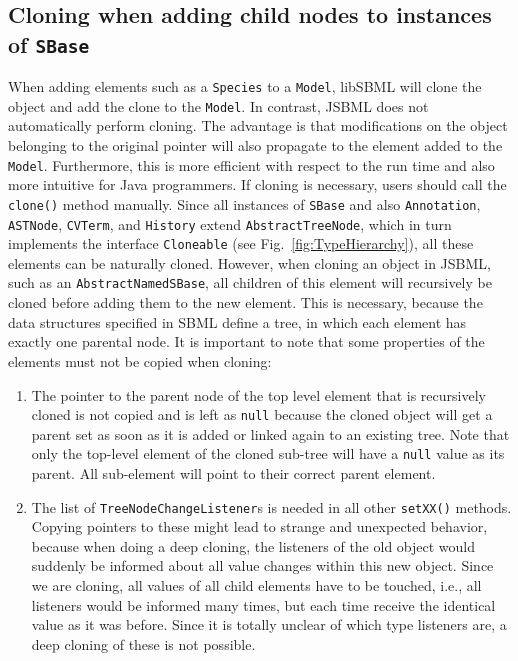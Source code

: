 \subsection{Cloning when adding child nodes to instances of \texttt{SBase}}

When adding elements such as a \texttt{Species}
%
to a \texttt{Model}, libSBML will
clone the object and add the clone to the \texttt{Model}. In contrast,
JSBML does
not automatically perform cloning. The advantage is that modifications on the
object belonging to the original pointer will also propagate to the element
added to the \texttt{Model}. Furthermore, this is more efficient with respect to
the run time and also more intuitive for Java programmers. If cloning is
necessary, users should call the \texttt{clone()} method manually. Since all
instances of \texttt{SBase} and also
\texttt{Annotation},
\texttt{ASTNode},
\texttt{CVTerm}, and
\texttt{History} extend
\texttt{AbstractTreeNode},
which in turn implements the interface \texttt{Cloneable} (see
Fig.~\vref{fig:TypeHierarchy}), all these elements can be naturally cloned.
However, when cloning an object in JSBML, such as an
\texttt{AbstractNamedSBase},
all children of this element will recursively be cloned before adding them to
the new element. This is necessary, because the data structures specified in
SBML  define a tree, in which each element
has exactly one parental node. It is important to note that some properties of
the elements must not be copied when cloning:
\begin{enumerate}
  \item The pointer to the parent node of the top level element
  that is recursively cloned is not copied and is left as \texttt{null}
  because the cloned object will get a parent set as soon as it is added or
  linked again to an existing tree. Note that only the top-level
  element of the cloned sub-tree will have a \texttt{null} value as its
  parent. All sub-element will point to their correct parent element.
  \item The list of
  \texttt{TreeNodeChangeListener}s
  is needed in all other \texttt{setXX()} methods. Copying pointers to these
  might lead to strange and unexpected behavior, because when doing a deep
  cloning, the listeners of the old object would suddenly be informed about all
  value changes within this new object.
  Since we are cloning, all values of all child elements have to be touched,
  i.e., all listeners would be informed many times, but each time receive the
  identical value as it was before. Since it is totally unclear of which type
  listeners are, a deep cloning of these is not possible.
\end{enumerate}

